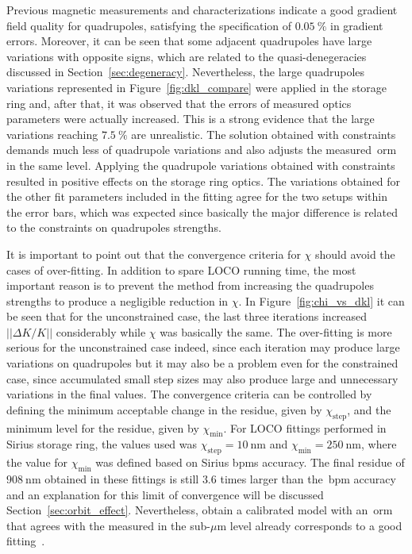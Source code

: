 Previous magnetic measurements and characterizations indicate a good gradient field quality for quadrupoles, satisfying the specification of $\SI{0.05}{\%}$ in gradient errors. Moreover, it can be seen that some adjacent quadrupoles have large variations with opposite signs, which are related to the quasi-denegeracies discussed in Section~\ref{sec:degeneracy}. Nevertheless, the large quadrupoles variations represented in Figure~\ref{fig:dkl_compare} were applied in the storage ring and, after that, it was observed that the errors of measured optics parameters were actually increased. This is a strong evidence that the large variations reaching $\SI{7.5}{\%}$ are unrealistic. The solution obtained with constraints demands much less of quadrupole variations and also adjusts the measured~\gls{orm} in the same level. Applying the quadrupole variations obtained with constraints resulted in positive effects on the storage ring optics. The variations obtained for the other fit parameters included in the fitting agree for the two setups within the error bars, which was expected since basically the major difference is related to the constraints on quadrupoles strengths.

It is important to point out that the convergence criteria for $\chi$ should avoid the cases of over-fitting. In addition to spare LOCO running time, the most important reason is to prevent the method from increasing the quadrupoles strengths to produce a negligible reduction in $\chi$. In Figure~\ref{fig:chi_vs_dkl} it can be seen that for the unconstrained case, the last three iterations increased $||\Delta K/K||$ considerably while $\chi$ was basically the same. The over-fitting is more serious for the unconstrained case indeed, since each iteration may produce large variations on quadrupoles but it may also be a problem even for the constrained case, since accumulated small step sizes may also produce large and unnecessary variations in the final values. The convergence criteria can be controlled by defining the minimum acceptable change in the residue, given by $\chi_{\mathrm{step}}$, and the minimum level for the residue, given by $\chi_{\mathrm{min}}$. For LOCO fittings performed in Sirius storage ring, the values used was $\chi_{\mathrm{step}} = \SI{10}{\nano\meter}$ and $\chi_{\mathrm{min}} = \SI{250}{\nano\meter}$, where the value for $\chi_{\mathrm{min}}$ was defined based on Sirius \glspl{bpm} accuracy. The final residue of $\SI{908}{\nano\meter}$ obtained in these fittings is still $3.6$ times larger than the~\gls{bpm} accuracy and an explanation for this limit of convergence will be discussed Section~\ref{sec:orbit_effect}. Nevertheless, obtain a calibrated model with an~\gls{orm} that agrees with the measured in the sub-$\mu$m level already corresponds to a good fitting~\cite{safranek1997}.

